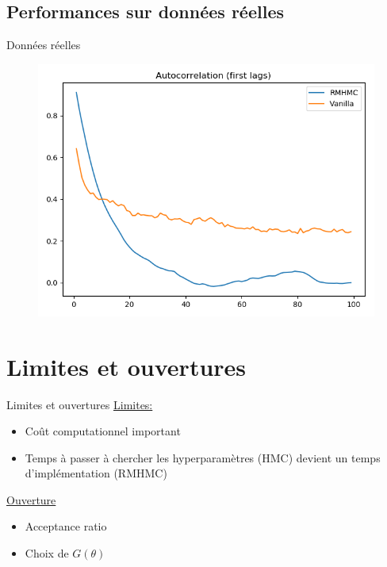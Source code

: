 \documentclass{beamer}
\begin{document}
\subsection{Performances sur données réelles}
\begin{frame}{Données réelles}
   \begin{figure}
   \includegraphics[scale=0.4]{figs/autocorr_real_6_vs_100.png}
   \end{figure}
\end{frame}

\section{Limites et ouvertures}
\begin{frame}{Limites et ouvertures}
\underline{Limites:}
\begin{itemize}
\item Coût computationnel important
\item Temps à passer à chercher les hyperparamètres (HMC) devient un temps d'implémentation (RMHMC)
\end{itemize}

\underline{Ouverture}
\begin{itemize}
\item Acceptance ratio
\item Choix de $G(\theta)$
\end{itemize}
\end{frame}

  \begin{frame}
  
  
  \end{frame}
 

  
\end{document}
